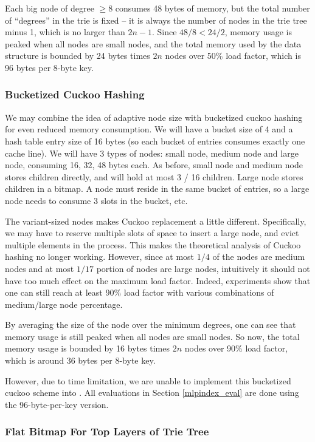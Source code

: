 \documentclass[11pt, usletter]{article}
\begin{document}
Each big node of degree $\geq 8$ consumes 48 bytes of memory, but the total number of ``degrees'' in the trie is fixed 
-- it is always the number of nodes in the trie tree minus 1, which is no larger than $2n-1$. 
Since $48/8<24/2$, memory usage is peaked when all nodes are small nodes, 
and the total memory used by the data structure is bounded by 24 bytes times $2n$ nodes over 50\% load factor, 
which is 96 bytes per 8-byte key.

\subsubsection*{Bucketized Cuckoo Hashing}  \label{variantsizehash}

We may combine the idea of adaptive node size with bucketized cuckoo hashing for even reduced memory consumption. 
We will have a bucket size of 4 and a hash table entry size of 16 bytes (so each bucket of entries consumes exactly one cache line).
We will have 3 types of nodes: small node, medium node and large node, consuming 16, 32, 48 bytes each. 
As before, small node and medium node stores children directly, and will hold at most 3 / 16 children. 
Large node stores children in a bitmap. A node must reside in the same bucket of entries, 
so a large node needs to consume 3 slots in the bucket, etc.

The variant-sized nodes makes Cuckoo replacement a little different. 
Specifically, we may have to reserve multiple slots of space to insert a large node, 
and evict multiple elements in the process. 
This makes the theoretical analysis of Cuckoo hashing no longer working. 
However, since at most $1/4$ of the nodes are medium nodes 
and at most $1/17$ portion of nodes are large nodes, 
intuitively it should not have too much effect on the maximum load factor. 
Indeed, experiments show that one can still reach at least 90\% load factor with various combinations 
of medium/large node percentage.

By averaging the size of the node over the minimum degrees, 
one can see that memory usage is still peaked when all nodes are small nodes.
So now, the total memory usage is bounded by 16 bytes times $2n$ nodes over 90\% load factor, 
which is around 36 bytes per 8-byte key.

However, due to time limitation, we are unable to implement this bucketized cuckoo scheme 
into \MlpIndex. All evaluations in Section \ref{mlpindex_eval} are done using the 96-byte-per-key version. 

\subsubsection*{Flat Bitmap For Top Layers of Trie Tree}
\end{document}
